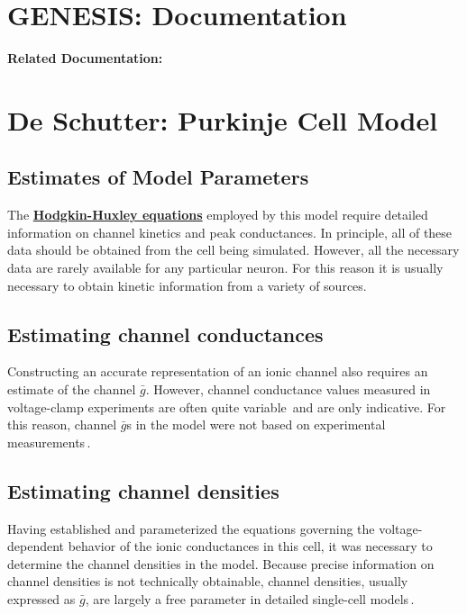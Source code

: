\documentclass[12pt]{article}
\begin{document}
\section*{GENESIS: Documentation}

{\bf Related Documentation:}

\section*{De Schutter: Purkinje Cell Model}

\subsection*{Estimates of Model Parameters}

The \href{../pub-purkinje-deschutter1-equations/pub-purkinje-deschutter1-equations.tex}{\bf Hodgkin-Huxley equations} employed by this model require detailed information on channel kinetics and peak conductances. In principle,
all of these data should be obtained from the cell being simulated.
However, all the necessary data are rarely available for any
particular neuron. For this reason it is usually necessary to obtain
kinetic information from a variety of sources.

\subsection*{Estimating channel conductances}

Constructing an accurate
representation of an ionic channel also requires an estimate of
the channel $\bar g$. However, channel conductance values measured in
voltage-clamp experiments are often quite variable\,\cite{McCormick:1992fk} and are only indicative. For this reason,
channel $\bar g$s in the model were not based on experimental measurements\,\cite{S:1993dz, De-Schutter-E:1993fu}.

\subsection*{Estimating channel densities}

Having established and parameterized the equations governing the
voltage-dependent behavior of the ionic conductances in this
cell, it was necessary to determine the channel densities in the
model. Because precise information on channel densities is not
technically obtainable, channel densities, usually expressed as $\bar g$,
are largely a free parameter in detailed single-cell models\,\cite{S:1993dz, L:1992kl, W:1991qa, Traub-R-D:1991mi}.
\end{document}
